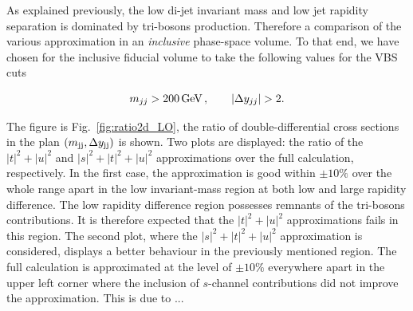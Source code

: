 As explained previously, the low di-jet invariant mass and low jet rapidity separation is dominated by tri-bosons production.
Therefore a comparison of the various approximation in an \emph{inclusive} phase-space volume.
To that end, we have chosen for the inclusive fiducial volume to take the following values for the VBS cuts 

\begin{equation}
\label{eq:inclusive}
	m_{jj} > 200\,\text{GeV}\,,\qquad |\Delta y_{jj}| > 2 .
\end{equation}


The figure is Fig.~\ref{fig:ratio2d_LO}, the ratio of double-differential cross sections in the plan $\left(m_{\text{j}\text{j}}, \Delta y_{\text{j}\text{j}}\right)$ is shown.
Two plots are displayed: the ratio of the $|t|^2 + |u|^2$ and $|s|^2 + |t|^2 + |u|^2$ approximations over the full calculation, respectively.
In the first case, the approximation is good within $\pm10\%$ over the whole range apart in the low invariant-mass region at both low and large rapidity difference.
The low rapidity difference region possesses remnants of the tri-bosons contributions.
It is therefore expected that the $|t|^2 + |u|^2$ approximations fails in this region.
The second plot, where the $|s|^2 + |t|^2 + |u|^2$ approximation is considered, displays a better behaviour in the previously mentioned region.
The full calculation is approximated at the level of $\pm10\%$ everywhere apart in the upper left corner where the inclusion of $s$-channel contributions did not improve the approximation.
This is due to ...

